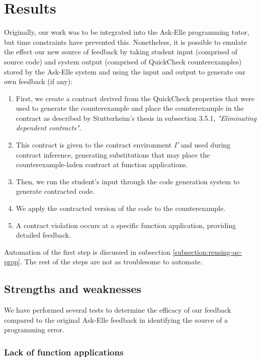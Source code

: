 \documentclass[10pt]{report}
\begin{document}
{\section{Results}
\label{section:results}

Originally, our work was to be integrated into the Ask-Elle programming tutor, but time constraints have prevented this.
Nonetheless, it is possible to emulate the effect our new source of feedback by taking student input (comprised of source code) and system output (comprised of QuickCheck counterexamples) stored by the Ask-Elle system and using the input and output to generate our own feedback (if any):

\begin{enumerate}
	\item First, we create a contract derived from the QuickCheck properties that were used to generate the counterexample and place the counterexample in the contract as described by Stutterheim's thesis in subsection 3.5.1, \textit{"Eliminating dependent contracts"}.
	\item This contract is given to the contract environment $\Gamma$ and used during contract inference, generating substitutions that may place the counterexample-laden contract at function applications.
	\item Then, we run the student's input through the code generation system to generate contracted code.
	\item We apply the contracted version of the code to the counterexample.
	\item A contract violation occurs at a specific function application, providing detailed feedback.
\end{enumerate}

Automation of the first step is discussed in subsection \ref{subsection:reusing-qc-prop}. The rest of the steps are not as troublesome to automate.

\subsection{Strengths and weaknesses}

We have performed several tests to determine the efficacy of our feedback compared to the original Ask-Elle feedback in identifying the source of a programming error.

\subsubsection{Lack of function applications}

}
\end{document}
